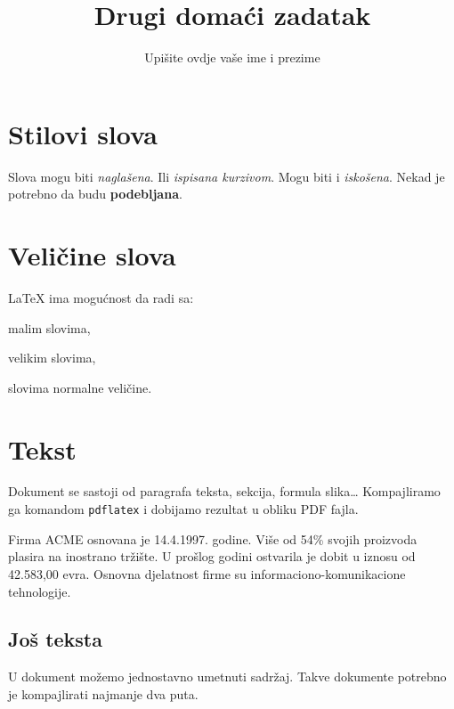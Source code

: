 \documentclass[12pt,twocolumn]{article}
\begin{document}
\title{Drugi domaći zadatak}
\author{Upišite ovdje vaše ime i prezime}
\maketitle
\section{Stilovi slova}
Slova mogu biti \emph{naglašena}. Ili \textit{ispisana kurzivom}. Mogu biti i \textsl{iskošena}. Nekad je potrebno da budu \textbf{podebljana}.

\section{Veličine slova}
\LaTeX{} ima mogućnost da radi sa:

\scriptsize malim slovima,

\Large velikim slovima,

\normalsize slovima normalne veličine.

\section{Tekst}
Dokument se sastoji od paragrafa teksta, sekcija, formula slika\ldots
Kompajliramo ga komandom \texttt{pdflatex} i dobijamo rezultat u obliku PDF fajla.

Firma ACME osnovana je 14.4.1997. godine. Više od 54\% svojih proizvoda plasira na inostrano tržište. U prošlog godini ostvarila je dobit u iznosu od 42.583,00 evra. Osnovna djelatnost firme su informaciono-komunikacione tehnologije.

\subsection{Još teksta}
U dokument možemo jednostavno umetnuti sadržaj. Takve dokumente potrebno je kompajlirati najmanje dva puta.

\tableofcontents
\end{document}
